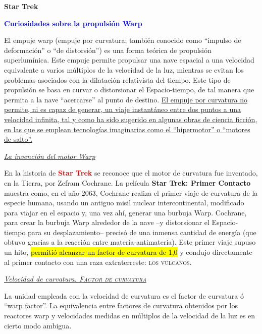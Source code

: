 \documentclass[a4paper,11pt]{article}
\begin{document}
\centerline{\Huge\sffamily\textbf{Star Trek}}

\medskip

 \centerline{\LARGE\textcolor{blue}{\textbf{Curiosidades sobre la propulsión Warp}}}

\bigskip

El empuje warp (empuje por curvatura; también conocido como ``impulso de deformación'' 
o ``de distorsión'') es una forma teórica de propulsión superlumínica. Este empuje permite
 propulsar una nave espacial a una velocidad equivalente a varios múltiplos de la 
velocidad de la luz, mientras se evitan los problemas asociados con la dilatación 
relativista del tiempo. Este tipo de propulsión se basa en curvar o distorsionar 
el Espacio-tiempo, de tal manera que permita a la nave ``acercarse'' al punto de 
destino. \ul{El empuje por curvatura no permite, ni es capaz de generar, un viaje 
instantáneo entre dos puntos a una velocidad infinita, tal y como ha sido sugerido 
en algunas obras de ciencia ficción, en las que se emplean tecnologías imaginarias 
como el ``hipermotor'' o ``motores de salto''.}

\bigskip

\noindent \ul{\large\textit{La invención del motor Warp}}
\medskip

En la historia de \textcolor{red}{\textbf{Star Trek}} se reconoce 
que el motor de curvatura fue inventado, en la Tierra, por Zefram 
Cochrane. La película \textbf{Star Trek: Primer Contacto} muestra como, 
en el año 2063, Cochrane realiza el primer viaje de curvatura de la especie humana, 
usando un antiguo misil nuclear intercontinental, modificado para viajar en el espacio 
y, una vez ahí, generar una burbuja Warp. Cochrane, para crear la burbuja Warp alrededor 
de la nave --y distorsionar el Espacio-tiempo para su desplazamiento-- precisó de una 
inmensa cantidad de energía (que obtuvo gracias a la reacción entre matería-antimateria). 
Este primer viaje supuso un hito, \hl{permitió alcanzar un factor de curvatura de 1,0} y 
condujo directamente al primer contacto con una raza extraterreste: \textsc{los vulcanos}.

\bigskip

\noindent \ul{\large\textit{Velocidad de curvatura. \textsc{Factor de curvatura}}}
\medskip

La unidad empleada con la velocidad de curvatura es el factor de curvatura 
ó ``warp factor''. La equivalencia entre factores de curvatura obtenidos por 
los reactores warp y velocidades medidas en múltiplos de la velocidad de 
la luz es en cierto modo ambigua.
\end{document}
